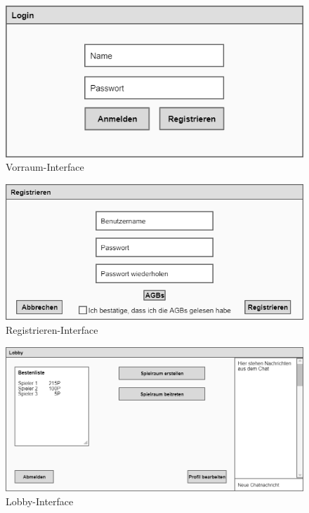 \newpage

\begin{figure}
	\centering
	\includegraphics[width=1.1\textwidth]{img/Login.png}
	\caption{Vorraum-Interface}
	\label{gui:login}
\end{figure}

\begin{figure}
	\centering
	\includegraphics[width=1.1\textwidth]{SEP_Lasten_Pflichtenheft/img/Registrieren.png}
	\caption{Registrieren-Interface}
	\label{gui:registrieren}
\end{figure}

\begin{figure}
	\centering
	\includegraphics[width=1.1\textwidth]{SEP_Lasten_Pflichtenheft/img/Lobby.png}
	\caption{Lobby-Interface}
	\label{gui:lobby}
\end{figure}

